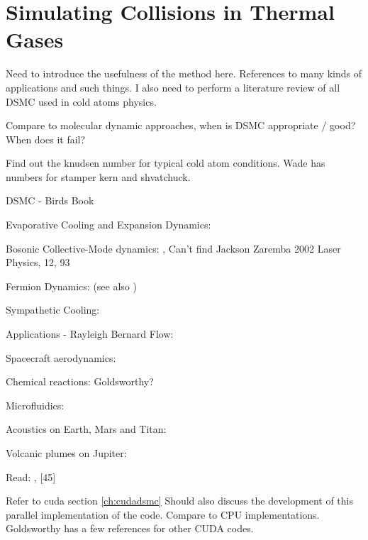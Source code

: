
\chapter{Simulating Collisions in Thermal Gases} %

\label{ch:inhomogas} %


Need to introduce the usefulness of the method here. References to many kinds of applications and such things. I also need to perform a literature review of all DSMC used in cold atoms physics.

Compare to molecular dynamic approaches, when is DSMC appropriate / good? When does it fail? 

Find out the knudsen number for typical cold atom conditions. Wade has numbers for stamper kern and shvatchuck.

DSMC - Birds Book \cite{Bird1994}

Evaporative Cooling and Expansion Dynamics: \cite{Wu1996, Wu1997, Wu1998}

Bosonic Collective-Mode dynamics: \cite{Jackson2001, Jackson2001b, Jackson2002, Jackson2002b, Jackson2002c}, Can't find Jackson Zaremba 2002 Laser Physics, 12, 93

Fermion Dynamics: \cite{Urban2006, Urban2007, Urban2008, Lepers2010} (see also \cite{Vignolo2002, Toschi2003, Capuzzi2004, Toschi2004})

Sympathetic Cooling: \cite{Barletta2010, Barletta2011}

Applications - Rayleigh Bernard Flow: \cite{Watanabe1994}

Spacecraft aerodynamics: \cite{Oran1998}

Chemical reactions: \cite{Anderson2003} Goldsworthy?

Microfluidics: \cite{Frangi2003}

Acoustics on Earth, Mars and Titan: \cite{Hanford2009}

Volcanic plumes on Jupiter: \cite{Zhang2004}

Read: \sout{\cite{Minguzzi2004}}, [45]

Refer to cuda section \ref{ch:cudadsmc} Should also discuss the development of this parallel implementation of the code. Compare to CPU implementations. Goldsworthy has a few references for other CUDA codes.

